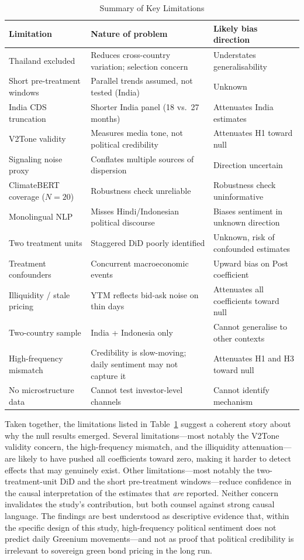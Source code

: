 \documentclass[12pt,a4paper]{article}
\begin{document}
\begin{table}[H]
\centering
\caption{Summary of Key Limitations}
\label{tab:limits}
\small
\begin{tabularx}{\textwidth}{p{4cm}p{5.5cm}X}
\toprule
\textbf{Limitation} & \textbf{Nature of problem} & \textbf{Likely bias direction} \\
\midrule
Thailand excluded       & Reduces cross-country variation; selection concern & Understates generalisability \\
Short pre-treatment windows & Parallel trends assumed, not tested (India) & Unknown \\
India CDS truncation    & Shorter India panel (18 vs.\ 27 months) & Attenuates India estimates \\
V2Tone validity         & Measures media tone, not political credibility & Attenuates H1 toward null \\
Signaling noise proxy   & Conflates multiple sources of dispersion & Direction uncertain \\
ClimateBERT coverage ($N=20$) & Robustness check unreliable & Robustness check uninformative \\
Monolingual NLP         & Misses Hindi/Indonesian political discourse & Biases sentiment in unknown direction \\
Two treatment units     & Staggered DiD poorly identified & Unknown, risk of confounded estimates \\
Treatment confounders   & Concurrent macroeconomic events & Upward bias on Post coefficient \\
Illiquidity / stale pricing & YTM reflects bid-ask noise on thin days & Attenuates all coefficients toward null \\
Two-country sample      & India + Indonesia only & Cannot generalise to other contexts \\
High-frequency mismatch & Credibility is slow-moving; daily sentiment may not capture it & Attenuates H1 and H3 toward null \\
No microstructure data  & Cannot test investor-level channels & Cannot identify mechanism \\
\bottomrule
\end{tabularx}
\end{table}

Taken together, the limitations listed in Table~\ref{tab:limits} suggest a coherent story about why the null results emerged. Several limitations---most notably the V2Tone validity concern, the high-frequency mismatch, and the illiquidity attenuation---are likely to have pushed all coefficients toward zero, making it harder to detect effects that may genuinely exist. Other limitations---most notably the two-treatment-unit DiD and the short pre-treatment windows---reduce confidence in the causal interpretation of the estimates that \textit{are} reported. Neither concern invalidates the study's contribution, but both counsel against strong causal language. The findings are best understood as descriptive evidence that, within the specific design of this study, high-frequency political sentiment does not predict daily Greenium movements---and not as proof that political credibility is irrelevant to sovereign green bond pricing in the long run.
\end{document}
